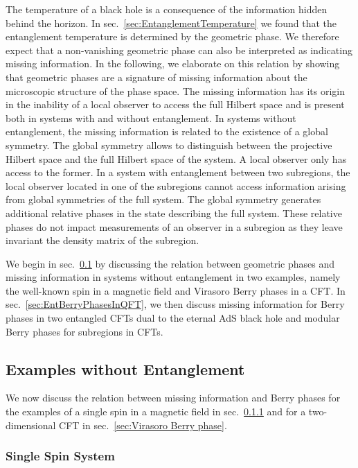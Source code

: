 \documentclass[a4paper,11pt]{article}
\newcommand{\1}{\mathds{1}}
\begin{document}
The temperature of a black hole is a consequence of the information hidden behind the horizon. In sec.~\ref{sec:EntanglementTemperature} we found that the entanglement temperature is determined by the geometric phase. We therefore expect that a non-vanishing geometric phase can also be interpreted as indicating missing information. In the following, we elaborate on this relation by showing that geometric phases are a signature of missing information about the microscopic structure of the phase space. The missing information has its origin in the inability of a local observer to access the full Hilbert space and is present both in systems with and without entanglement. In systems without entanglement, the missing information is related to the existence of a global symmetry. The global symmetry allows to distinguish between the projective Hilbert space and the full Hilbert space of the system. A local observer only has access to the former. In a system with entanglement between two subregions, the local observer located in one of the subregions cannot access information arising from global symmetries of the full system. The global symmetry generates additional relative phases in the state describing the full system. These relative phases do not impact measurements of an observer in a subregion as they leave invariant the density matrix of the subregion.

We begin in sec.~\ref{sec:Examples without entanglement} by discussing the relation between geometric phases and missing information in systems without entanglement in two examples, namely the well-known spin in a magnetic field \cite{Berry:1984jv} and Virasoro Berry phases \cite{Oblak:2017ect} in a CFT. In sec.~\ref{sec:EntBerryPhasesInQFT}, we then discuss missing information for Berry phases in two entangled CFTs dual to the eternal AdS black hole and modular Berry phases for subregions in CFTs.

\subsection{Examples without Entanglement}
\label{sec:Examples without entanglement}

We now discuss the relation between missing information and Berry phases for the examples of a single spin in a magnetic field in sec.~\ref{sec:SingleSpin} and for a two-dimensional CFT in sec.~\ref{sec:Virasoro Berry phase}.

\subsubsection{Single Spin System}
\label{sec:SingleSpin}
\end{document}
